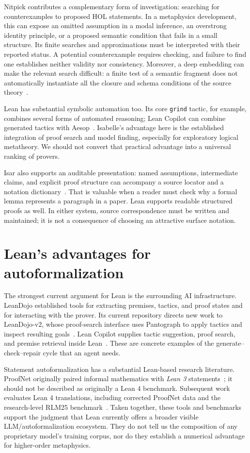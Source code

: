 \documentclass[12pt,leqno]{article}
\newcommand{\isa}[1]{\nolinkurl{#1}}
\begin{document}
Nitpick contributes a complementary form of investigation: searching for
counterexamples to proposed HOL statements. In a metaphysics development,
this can expose an omitted assumption in a modal inference, an overstrong
identity principle, or a proposed semantic condition that fails in a small
structure. Its finite searches and approximations must be interpreted with
their reported status. A potential counterexample requires checking, and
failure to find one establishes neither validity nor consistency. Moreover,
a deep embedding can make the relevant search difficult: a finite test of a
semantic fragment does not automatically instantiate all the closure and
schema conditions of the source theory~\cite{nitpick}.

Lean has substantial symbolic automation too. Its core \isa{grind} tactic,
for example, combines several forms of automated reasoning; Lean Copilot can
combine generated tactics with Aesop~\cite{lean-grind,copilot}. Isabelle's
advantage here is the established integration of proof search and model
finding, especially for exploratory logical metatheory. We should not
convert that practical advantage into a universal ranking of provers.

Isar also supports an auditable presentation: named assumptions, intermediate
claims, and explicit proof structure can accompany a source locator and a
notation dictionary~\cite{isar}. That is valuable when a reader must check
why a formal lemma represents a paragraph in a paper. Lean supports readable
structured proofs as well. In either system, source correspondence must be
written and maintained; it is not a consequence of choosing an attractive
surface notation.

\section{Lean's advantages for autoformalization}

The strongest current argument for Lean is the surrounding AI infrastructure.
LeanDojo established tools for extracting premises, tactics, and proof states
and for interacting with the prover. Its current repository directs new work
to LeanDojo-v2, whose proof-search interface uses Pantograph to apply tactics
and inspect resulting goals~\cite{dojo}. Lean Copilot supplies tactic
suggestion, proof search, and premise retrieval inside Lean~\cite{copilot}.
These are concrete examples of the generate--check--repair cycle that an
agent needs.

Statement autoformalization has a substantial Lean-based research literature.
ProofNet originally paired informal mathematics with \emph{Lean 3}
statements~\cite{proofnet}; it should not be described as originally a Lean 4
benchmark. Subsequent work evaluates Lean 4 translations, including corrected
ProofNet data and the research-level RLM25 benchmark~\cite{evaluation}.
Taken together, these tools and benchmarks support the judgment that Lean
currently offers a broader visible LLM/autoformalization ecosystem. They do
not tell us the composition of any proprietary model's training corpus, nor
do they establish a numerical advantage for higher-order metaphysics.
\end{document}
